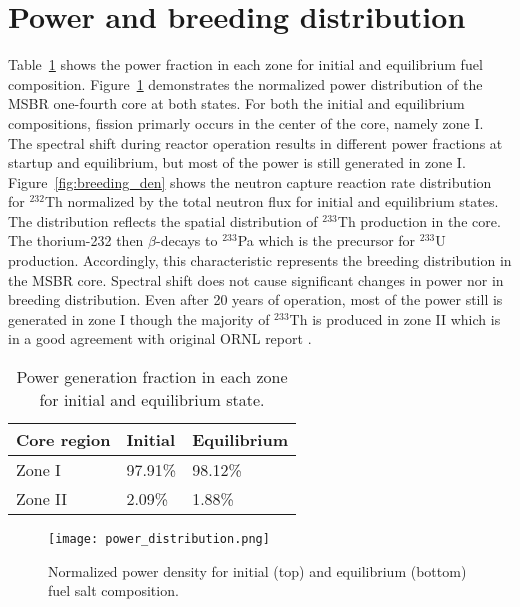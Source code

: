 \section{Power and breeding distribution}
Table~\ref{tab:powgen_fraction} shows the power fraction in each zone for initial and equilibrium fuel composition. Figure~\ref{fig:pow_den} demonstrates the normalized power distribution of the \gls{MSBR} one-fourth core at both states. For both the initial and equilibrium compositions, fission primarly occurs in the center of the core, namely zone I. The spectral shift during reactor operation results in different power fractions at startup and equilibrium, but most of the power is still generated in zone I. Figure~\ref{fig:breeding_den} shows the neutron capture reaction rate distribution for $^{232}$Th normalized by the total neutron flux for initial and equilibrium states. The distribution reflects the spatial distribution of $^{233}$Th production in the core. The thorium-232 then $\beta$-decays to $^{233}$Pa which is the precursor for $^{233}$U production. Accordingly, this characteristic represents the breeding distribution in the \gls{MSBR} core. Spectral shift does not cause significant changes in power nor in breeding distribution. Even after 20 years of operation, most of the power still is generated in zone I though the majority of $^{233}$Th is produced in zone II which is in a good agreement with original ORNL report \cite{robertson_conceptual_1971}.

\begin{table}[ht!]
  \centering
  \caption{Power generation fraction in each zone for initial and equilibrium state.}
\begin{tabular}{| m{} | m{} | m{} |} \hline
Core region      & Initial      & Equilibrium   \\ [3pt]\hline   
Zone I           & 97.91\%      & 98.12\%   \\ [3pt] \hline
Zone II          & 2.09\%       & 1.88\%   \\ [3pt] \hline
\end{tabular}
  \label{tab:powgen_fraction}
\end{table}

\begin{figure}[htp!] %
  \centering
    \vspace{-0.3em}
  \texttt{[image: power\_distribution.png]} 
  \caption{Normalized power density for initial (top) and equilibrium (bottom) fuel salt composition.}
    \vspace{-0.6em}
  \label{fig:pow_den}
\end{figure}
\FloatBarrier

